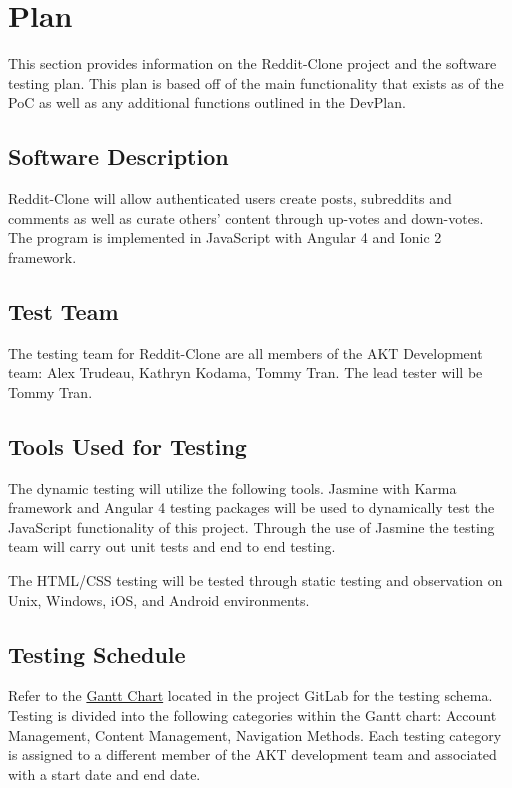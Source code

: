 \documentclass[12pt,fleqn]{article}
\begin{document}
\pagebreak
\section {Plan}
This section provides information on the Reddit-Clone project and the software testing plan. This plan is based off of the main functionality that exists as of the PoC as well as any additional functions outlined in the DevPlan.

\subsection {Software Description}
Reddit-Clone will allow authenticated users create posts, subreddits and comments as well as curate others' content through up-votes and down-votes.  The program is implemented in JavaScript with Angular 4 and Ionic 2 framework.

\subsection {Test Team}
The testing team for Reddit-Clone are all members of the AKT Development team: Alex Trudeau, Kathryn Kodama, Tommy Tran.  The lead tester will be Tommy Tran.

\subsection {Tools Used for Testing}
The dynamic testing will utilize the following tools.  Jasmine with Karma framework and Angular 4 testing packages will be used to dynamically test the JavaScript functionality of this project.  Through the use of Jasmine the testing team will carry out unit tests and end to end testing.

The HTML/CSS testing will be tested through static testing and observation on Unix, Windows, iOS, and Android environments.

\subsection {Testing Schedule}

Refer to the \href{https://gitlab.cas.mcmaster.ca/trudeaua/reddit-clone}{Gantt Chart} located in the project GitLab for the testing schema.   Testing is divided into the following categories within the Gantt chart: Account Management, Content Management, Navigation Methods.  Each testing category is assigned to a different member of the AKT development team and associated with a start date and end date.
\end{document}
